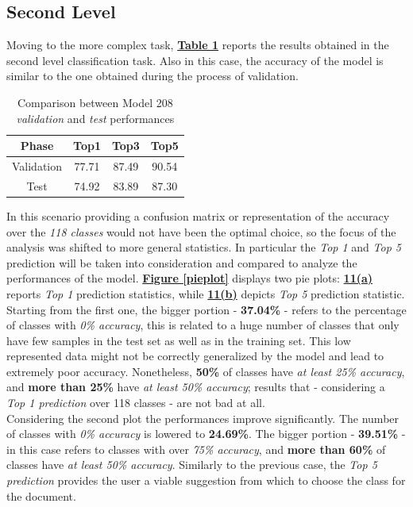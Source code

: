 \documentclass[12pt]{article}
\begin{document}
\subsection{Second Level}
Moving to the more complex task, \hyperref[tb:secondtest]{\textbf{Table \ref{tb:secondtest}}} reports the results obtained in the second level classification task. Also in this case, the accuracy of the model is similar to the one obtained during the process of validation.
\begin{table}[ht!]
    \begin{adjustwidth}{}{}
	    \centering
	    \small
	    \begin{tabular}{ |c|c|c|c| }
        \hline
        \textbf{Phase} & \textbf{Top1} & \textbf{Top3} & \textbf{Top5}\\
        \hline
        Validation & 77.71 & 87.49 & 90.54\\
        Test & 74.92 & 83.89 & 87.30\\
        
        \hline
        \end{tabular}
    \end{adjustwidth}
    \captionsetup{justification   = centering}
    \caption{Comparison between Model 208 \\\textit{validation} and \textit{test} performances}
    \label{tb:secondtest}
\end{table}

In this scenario providing a confusion matrix or representation of the accuracy over the \textit{118 classes} would not have been the optimal choice, so the focus of the analysis was shifted to more general statistics. In particular the \textit{Top 1} and \textit{Top 5} prediction will be taken into consideration and compared to analyze the performances of the model. \hyperref[pieplot]{\textbf{Figure \ref{pieplot}}} displays two pie plots: \hyperref[a]{\textbf{11(a)}} reports \textit{Top 1} prediction statistics, while \hyperref[b]{\textbf{11(b)}} depicts \textit{Top 5} prediction statistic.\\
Starting from the first one, the bigger portion - \textbf{37.04\%} - refers to the percentage of classes with \textit{0\% accuracy}, this is related to a huge number of classes that only have few samples in the test set as well as in the training set. This low represented data might not be correctly generalized by the model and lead to extremely poor accuracy. Nonetheless, \textbf{50\%} of classes have \textit{at least 25\% accuracy}, and \textbf{more than 25\%} have \textit{at least 50\% accuracy}; results that - considering a \textit{Top 1 prediction} over 118 classes - are not bad at all.\\
Considering the second plot the performances improve significantly. The number of classes with \textit{0\% accuracy} is lowered to \textbf{24.69\%}. The bigger portion - \textbf{39.51\%} - in this case refers to classes with over \textit{75\% accuracy}, and \textbf{more than 60\%} of classes have \textit{at least 50\% accuracy}. Similarly to the previous case, the \textit{Top 5 prediction} provides the user a viable suggestion from which to choose the class for the document.
\end{document}
